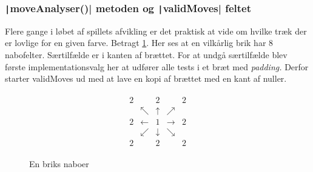 \subsubsection{\texorpdfstring{\texttt|moveAnalyser()| metoden og \texttt|validMoves| feltet}{moveAnalyser() metoden og validMoves feltet}}\label{sec:moveAnalyser}
Flere gange i løbet af spillets afvikling er det praktisk at vide om hvilke træk der er lovlige for en given farve. Betragt \cref{fig:directions}. Her ses at en vilkårlig brik har 8 nabofelter. Særtilfælde er i kanten af brættet. For at undgå særtilfælde blev første implementationsvalg her at udfører alle tests i et bræt med \emph{padding.} Derfor starter validMoves ud med at lave en kopi af brættet med en kant af nuller.
\begin{figure}[H]
    \caption{En briks naboer}\label{fig:directions}
    \begin{align*}
        \begin{array}{ccccc}
            2 &            & 2          &             & 2 \\
              & \nwarrow   & \uparrow   & \nearrow    &   \\
            2 & \leftarrow & 1          & \rightarrow & 2 \\
              & \swarrow   & \downarrow & \searrow    &   \\
            2 &            & 2          &             & 2
        \end{array}
    \end{align*}
\end{figure}

